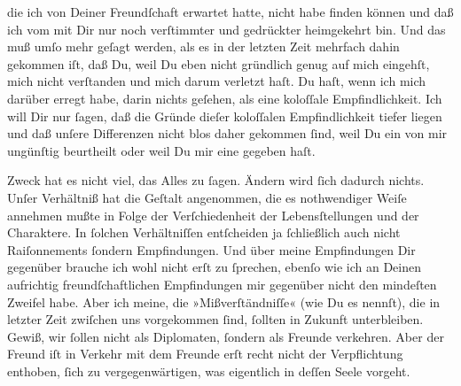                die ich von Deiner Freundſchaft erwartet hatte, nicht habe finden können und daß ich
               vom \label{K_L03194-2v}\label{K_L03194-2h} mit Dir nur noch verſtimmter und gedrückter heimgekehrt bin. Und das muß umſo
               mehr geſagt werden, als es in der letzten Zeit mehrfach dahin gekommen iſt, daß Du,
               weil Du eben nicht gründlich genug auf mich eingehſt, mich \strikeout{\textcolor{gray}{×}\-\textcolor{gray}{×}} nicht verſtanden und mich darum verletzt haſt. Du haſt, wenn ich mich darüber
               erregt habe, darin nichts geſehen, als eine koloſſale Empfindlichkeit. Ich will Dir
               nur ſagen, daß die Gründe dieſer koloſſalen Empfindlichkeit tiefer liegen und daß
               unſere Differenzen nicht blos daher gekommen ſind, weil Du ein \label{K_L03194-11v}\label{K_L03194-11h} von mir ungünſtig beurtheilt  oder weil Du mir eine \label{K_L03194-12v}\label{K_L03194-12h} gegeben haſt.\pend
           
\pstart
           Zweck hat es nicht viel, das Alles zu ſagen. Ändern wird ſich dadurch nichts. Unſer
               Verhältniß hat die Geſtalt angenommen, {\pb}die es
               nothwendiger Weiſe annehmen mußte in Folge der Verſchiedenheit der Lebensſtellungen
               und der Charaktere. In ſolchen Verhältniſſen entſcheiden ja ſchließlich auch nicht
               Raiſonnements ſondern Empfindungen. Und über meine Empfindungen Dir gegenüber brauche
               ich wohl nicht erſt zu ſprechen, ebenſo wie ich an Deinen aufrichtig
               freundſchaftlichen Empfindungen  mir gegenüber
               nicht den mindeſten Zweifel habe. Aber ich meine, die »Mißverſtändniſſe« (wie Du es
               nennſt), die in letzter Zeit zwiſchen uns vorgekommen ſind, ſollten in Zukunft
               unterbleiben. Gewiß, wir ſollen nicht als Diplomaten, ſondern als Freunde verkehren.
               Aber der Freund iſt in Verkehr mit dem Freunde erſt recht nicht
               der Verpflichtung enthoben, ſich zu vergegenwärtigen, was eigentlich in deſſen Seele
               vorgeht.\pend
           
